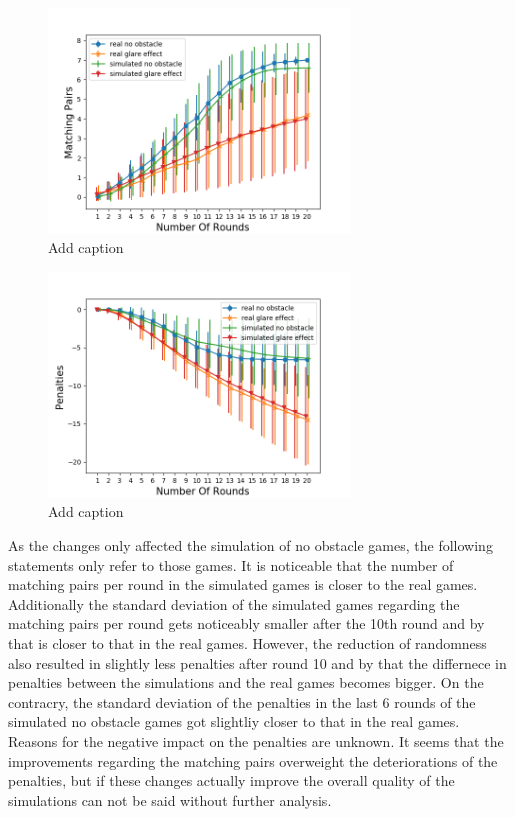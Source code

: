 \begin{minipage}{0.5\textwidth}
	\begin{figure}[H]
		\centering
		\includegraphics[width=8cm]{images/simulationOptimized1.png}
		\caption[Bild kurz]{Add caption}
		\label{fig:simOp1}
	\end{figure}
\end{minipage}
\begin{minipage}{0.5\textwidth}
	\begin{figure}[H]
		\centering
		\includegraphics[width=8cm]{images/simulationOptimized2.png}
		\caption[Bild kurz]{Add caption}
		\label{fig:simOp2}
	\end{figure}
\end{minipage} 

As the changes only affected the simulation of no obstacle games, the following statements only refer to those games. It is noticeable that the number of matching pairs per round in the simulated games is closer to the real games. Additionally the standard deviation of the simulated games regarding the matching pairs per round gets noticeably smaller after the 10th round and by that is closer to that in the real games. However, the reduction of randomness also resulted in slightly less penalties after round 10 and by that the differnece in penalties between the simulations and the real games becomes bigger. On the contracry, the standard deviation of the penalties in the last 6 rounds of the simulated no obstacle games got slightliy closer to that in the real games. Reasons for the negative impact on the penalties are unknown. It seems that the improvements regarding the matching pairs overweight the deteriorations of the penalties, but if these changes actually improve the overall quality of the simulations can not be said without further analysis. 


